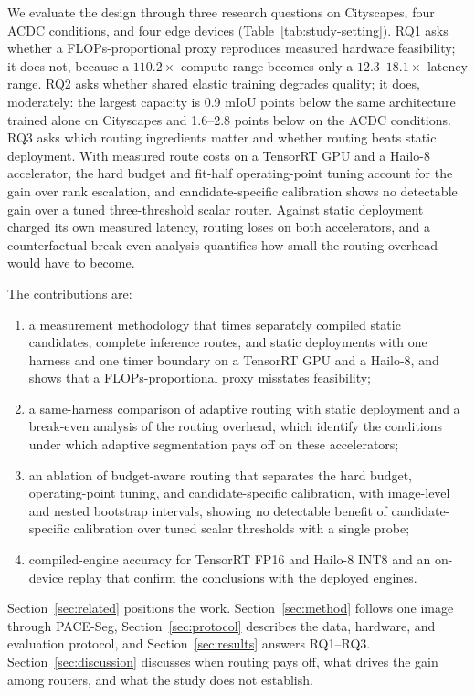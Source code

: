 \documentclass[a4paper,5p]{elsarticle}
\newcommand{\method}{PACE-Seg}
\newcommand{\miou}{mIoU}
\begin{document}
We evaluate the design through three research questions on Cityscapes, four ACDC conditions, and four edge devices (Table~\ref{tab:study-setting}). RQ1 asks whether a FLOPs-proportional proxy reproduces measured hardware feasibility; it does not, because a $110.2\times$ compute range becomes only a $12.3$--$18.1\times$ latency range. RQ2 asks whether shared elastic training degrades quality; it does, moderately: the largest capacity is 0.9 \miou{} points below the same architecture trained alone on Cityscapes and 1.6--2.8 points below on the ACDC conditions. RQ3 asks which routing ingredients matter and whether routing beats static deployment. With measured route costs on a TensorRT GPU and a Hailo-8 accelerator, the hard budget and fit-half operating-point tuning account for the gain over rank escalation, and candidate-specific calibration shows no detectable gain over a tuned three-threshold scalar router. Against static deployment charged its own measured latency, routing loses on both accelerators, and a counterfactual break-even analysis quantifies how small the routing overhead would have to become.

The contributions are:
\begin{enumerate}
    \item a measurement methodology that times separately compiled static candidates, complete inference routes, and static deployments with one harness and one timer boundary on a TensorRT GPU and a Hailo-8, and shows that a FLOPs-proportional proxy misstates feasibility;
    \item a same-harness comparison of adaptive routing with static deployment and a break-even analysis of the routing overhead, which identify the conditions under which adaptive segmentation pays off on these accelerators;
    \item an ablation of budget-aware routing that separates the hard budget, operating-point tuning, and candidate-specific calibration, with image-level and nested bootstrap intervals, showing no detectable benefit of candidate-specific calibration over tuned scalar thresholds with a single probe;
    \item compiled-engine accuracy for TensorRT FP16 and Hailo-8 INT8 and an on-device replay that confirm the conclusions with the deployed engines.
\end{enumerate}

Section~\ref{sec:related} positions the work. Section~\ref{sec:method} follows one image through \method{}, Section~\ref{sec:protocol} describes the data, hardware, and evaluation protocol, and Section~\ref{sec:results} answers RQ1--RQ3. Section~\ref{sec:discussion} discusses when routing pays off, what drives the gain among routers, and what the study does not establish.
\end{document}
